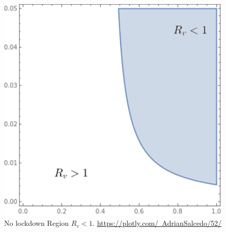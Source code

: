 \begin{figure}[tbh]
    \centering
    \includegraphics[scale=0.5,
    keepaspectratio]{Figures/NoLockdown.pdf}
    \caption{No lockdown Region $R_v<1$.
        \href{https://plotly.com/~AdrianSalcedo/52/}{%
            https://plotly.com/~AdrianSalcedo/52/}
    }
    \label{fig:Nolockdown}
\end{figure}

